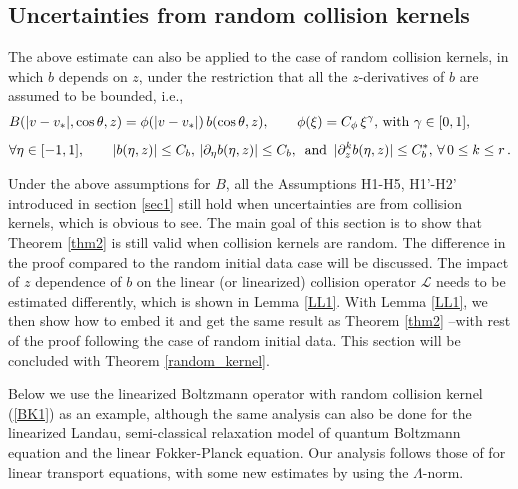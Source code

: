 \documentclass[final,onefignum,onetabnum]{siamart171218}
\newcounter{example}
\begin{document}
\subsection{Uncertainties from random collision kernels}
\label{kernel}
The above estimate can also be applied to the case of random collision kernels, in which $b$ depends on $z$,
under the restriction that all the $z$-derivatives of $b$ are assumed to be bounded, i.e.,
\begin{align}
&\displaystyle B(|v-v_{\ast}|, \cos\theta, z) = \phi(|v-v_{\ast}|)\, b(\cos\theta,z),  \qquad
\phi(\xi) = C_{\phi}\, \xi^{\gamma}, \,\text{with      }\gamma\in[0,1], \notag\\[4pt]
&\label{BK1}\displaystyle \forall\eta\in[-1,1], \qquad |b(\eta,z)|\leq C_b, \, |\partial_{\eta} b(\eta,z)|\leq C_b, \,  \text{  and }\,
|\partial_z^k b(\eta, z)|\leq C_b^{\ast},  \,  \forall\, 0\leq k\leq r\,.
\end{align}

Under the above assumptions for $B$, 
all the Assumptions H1-H5, H1'-H2' introduced in section \ref{sec1} still hold when uncertainties are from collision kernels, 
which is obvious to see. The main goal of this section is to show that 
Theorem \ref{thm2} is still valid when collision kernels are random. 
The difference in the proof compared to the random initial data case will be discussed. 
The impact of $z$ dependence of $b$ on the linear (or linearized) collision operator $\mathcal L$ needs to be
estimated differently, which is shown in Lemma \ref{LL1}. 
With Lemma \ref{LL1}, we then show how to embed it and get the same result as Theorem \ref{thm2}
--with rest of the proof following the case of random initial data. 
This section will be concluded with Theorem \ref{random_kernel}. 

Below we use the linearized Boltzmann operator with random collision kernel (\ref{BK1}) as an example, although the same analysis can also be done 
for the linearized Landau, semi-classical relaxation model of quantum Boltzmann equation and the linear Fokker-Planck equation. 
Our analysis follows those of \cite{Ma, Liu} for linear transport equations, with some new estimates by using the $\Lambda$-norm.
\end{document}
